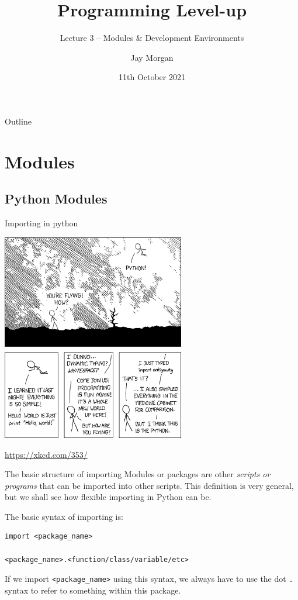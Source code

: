 \documentclass[10pt]{beamer}
\author{Jay Morgan}
\date{11th October 2021}
\title{Programming Level-up}
\subtitle{Lecture 3 -- Modules \& Development Environments}
\begin{document}
\maketitle
\begin{frame}{Outline}
\tableofcontents
\end{frame}


\section{Modules}
\label{sec:org1895584}

\subsection{Python Modules}
\label{sec:org57f0b5e}

\begin{frame}[label={sec:org7094c73}]{Importing in python}
\begin{center}
\includegraphics[width=0.6\textwidth]{images/python.png}
\end{center}
\url{https://xkcd.com/353/}
\end{frame}

\begin{frame}[label={sec:orgd8daac0},fragile]{The basic structure of importing}
 Modules or packages are other \emph{scripts or programs} that can be imported into other
scripts. This definition is very general, but we shall see how flexible importing in
Python can be.

The basic syntax of importing is:

\begin{verbatim}
import <package_name>

<package_name>.<function/class/variable/etc>
\end{verbatim}

If we import \texttt{<package\_name>} using this syntax, we always have to use the dot \texttt{.} syntax
to refer to something within this package.
\end{frame}
\end{document}
